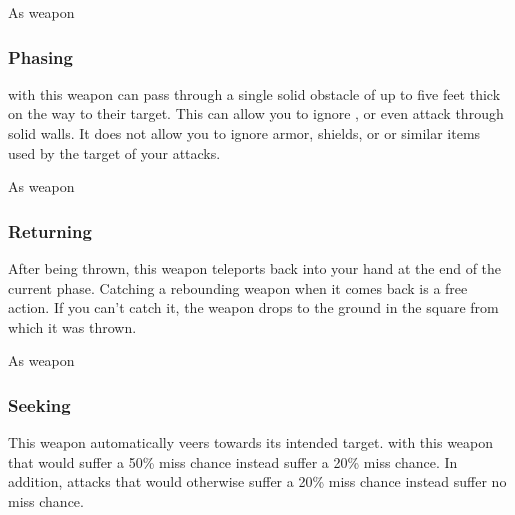  


 As weapon


\lowercase{\hypertarget{item:Phasing}{}}\label{item:Phasing}
\hypertarget{item:Phasing}{\subsubsection{Phasing\hfill{}}}

 with this weapon can pass through a single solid obstacle of up to five feet thick on the way to their target.
This can allow you to ignore , or even attack through solid walls.
It does not allow you to ignore armor, shields, or or similar items used by the target of your attacks.



 


 As weapon


\lowercase{\hypertarget{item:Returning}{}}\label{item:Returning}
\hypertarget{item:Returning}{\subsubsection{Returning\hfill{}}}

After being thrown, this weapon teleports back into your hand at the end of the current phase.
Catching a rebounding weapon when it comes back is a free action.
If you can't catch it, the weapon drops to the ground in the square from which it was thrown.



 


 As weapon


\lowercase{\hypertarget{item:Seeking}{}}\label{item:Seeking}
\hypertarget{item:Seeking}{\subsubsection{Seeking\hfill{}}}

This weapon automatically veers towards its intended target.
 with this weapon that would suffer a 50\% miss chance instead suffer a 20\% miss chance.
In addition, attacks that would otherwise suffer a 20\% miss chance instead suffer no miss chance.



 


